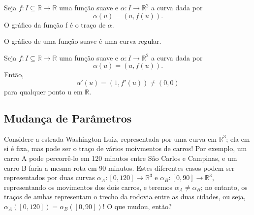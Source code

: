 \documentclass[../differential_geometry.tex]{subfiles}
\begin{document}
\begin{example}
	Seja \(f:I\subseteq \mathbb{R}\rightarrow \mathbb{R}\) uma função suave e \(\alpha:I\rightarrow \mathbb{R}^{2}\) a curva dada por
	\[
		\alpha (u)=(u, f(u)).
	\]
	O gráfico da função f é o traço de \(\alpha \).
\end{example}
\begin{prop*}
	O gráfico de uma função suave é uma curva regular.
\end{prop*}
\begin{proof*}
	Seja \(f:I\subseteq \mathbb{R}\rightarrow \mathbb{R}\) uma função suave e \(\alpha:I\rightarrow \mathbb{R}^{2}\) a curva dada por
	\[
		\alpha (u)=(u, f(u)).
	\]
	Então,
	\[
		\alpha'(u)=(1, f'(u)) \neq (0,0)
	\]
	para qualquer ponto u em \(\mathbb{R}.\) \qedsymbol
\end{proof*}

\subsection{Mudança de Parâmetros}
Considere a estrada Washington Luiz, representada por uma curva em \(\mathbb{R}^{3}\); ela em si é fixa, mas pode ser o traço de vários moivmentos de carros! Por exemplo, um carro A pode percorrê-lo em 120 minutos entre São Carlos e Campinas, e um carro B faria a mesma rota em 90 minutos.
Estes diferentes casos podem ser representados por duas curvas \(\alpha_{A}:[0,120]\rightarrow \mathbb{R}^{3}\) e \(\alpha_{B}:[0,90]\rightarrow \mathbb{R}^{3}\), representando os movimentos dos dois carros, e teremos \(\alpha_{A}\neq \alpha_{B}\); no entanto, os traços de ambas representam o trecho da rodovia entre as duas cidades, ou seja, \(\alpha_{A}([0,120])=\alpha_{B}([0,90])\)! O que mudou, então?
\end{document}
